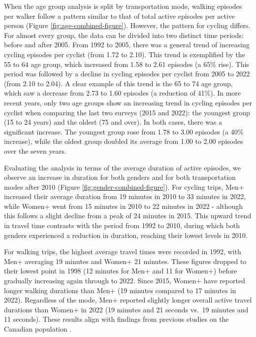 \documentclass[preprint, 3p,
authoryear]{elsarticle} %
\begin{document}
When the age group analysis is split by transportation mode, walking
episodes per walker follow a pattern similar to that of total active
episodes per active person (Figure \ref{fig:age-combined-figure}).
However, the pattern for cycling differs. For almost every group, the
data can be divided into two distinct time periods: before and after
2005. From 1992 to 2005, there was a general trend of increasing cycling
episodes per cyclist (from 1.72 to 2.10). This trend is exemplified by
the 55 to 64 age group, which increased from 1.58 to 2.61 episodes (a
65\% rise). This period was followed by a decline in cycling episodes
per cyclist from 2005 to 2022 (from 2.10 to 2.04). A clear example of
this trend is the 65 to 74 age group, which saw a decrease from 2.73 to
1.60 episodes (a reduction of 41\%). In more recent years, only two age
groups show an increasing trend in cycling episodes per cyclist when
comparing the last two surveys (2015 and 2022): the youngest group (15
to 24 years) and the oldest (75 and over). In both cases, there was a
significant increase. The youngest group rose from 1.78 to 3.00 episodes
(a 40\% increase), while the oldest group doubled its average from 1.00
to 2.00 episodes over the seven years.

Evaluating the analysis in terms of the average duration of active
episodes, we observe an increase in duration for both genders and for
both transportation modes after 2010 (Figure
\ref{fig:gender-combined-figure}). For cycling trips, Men+ increased
their average duration from 19 minutes in 2010 to 33 minutes in 2022,
while Women+ went from 15 minutes in 2010 to 22 minutes in 2022 -
although this follows a slight decline from a peak of 24 minutes in
2015. This upward trend in travel time contrasts with the period from
1992 to 2010, during which both genders experienced a reduction in
duration, reaching their lowest levels in 2010.

For walking trips, the highest average travel times were recorded in
1992, with Men+ averaging 19 minutes and Women+ 21 minutes. These
figures dropped to their lowest point in 1998 (12 minutes for Men+ and
11 for Women+) before gradually increasing again through to 2022. Since
2015, Women+ have reported longer walking durations than Men+ (19
minutes compared to 17 minutes in 2022). Regardless of the mode, Men+
reported slightly longer overall active travel durations than Women+ in
2022 (19 minutes and 21 seconds vs.~19 minutes and 11 seconds). These
results align with findings from previous studies on the Canadian
population \citep{bryan2009, borhani2024}.
\end{document}
